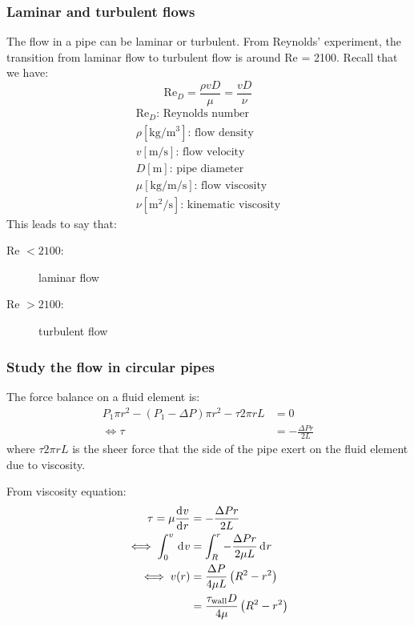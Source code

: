 \documentclass[10pt, twocolumn]{article}
\begin{document}
\subsubsection{Laminar and turbulent flows}
The flow in a pipe can be laminar or turbulent.
From Reynolds' experiment, the transition from laminar flow to turbulent flow is around Re = 2100.
Recall that we have:
\[
  \mathrm{Re}_D = \frac{\rho v D}{\mu} = \frac{v D}{\nu}
\]
\[
  \begin{array}{|l}
    \mathrm{Re}_D \text{: Reynolds number}                            \\
    \rho [\si{\kilogram\per\metre\cubed}] \text{: flow density}       \\
    v [\si{\metre\per\second}] \text{: flow velocity}                 \\
    D [\si{\metre}] \text{: pipe diameter}                            \\
    \mu [\si{\kilogram\per\meter\per\second}] \text{: flow viscosity} \\
    \nu [\si{\meter\squared\per\second}] \text{: kinematic viscosity}
  \end{array}
\]
This leads to say that:
\begin{description}
  \item[Re \(< 2100\):] laminar flow
  \item[Re \(> 2100\):] turbulent flow
\end{description}


\subsubsection{Study the flow in circular pipes}
The force balance on a fluid element is:
\begin{align*}
  P_1 \pi r^2 - (P_1 - \Delta P) \pi r^2 - \tau 2 \pi r L & = 0                        \\
  \iff \tau                                               & = - \frac{\Delta P r}{2 L}
\end{align*}
where \(\tau 2 \pi r L\) is the sheer force that the side of the pipe exert on the fluid element due to viscosity.

From viscosity equation:
\begin{align*}
  \tau = \mu \frac{\mathrm{d}^{} v}{\mathrm{d}^{} r} & = - \frac{\Delta P r}{2 L}                                    \\
  \iff \int_0^v{ \,\mathrm{d}^{} v}  & = \int_R^r{- \frac{\Delta P r}{2 \mu L} \,\mathrm{d}^{} r}          \\
  \iff v(r)                    & = \frac{\Delta P}{4 \mu L} \left( R^2 - r^2 \right)           \\
                               & = \frac{\tau_\mathrm{wall} D}{4 \mu} \left( R^2 - r^2 \right)
\end{align*}
\end{document}
